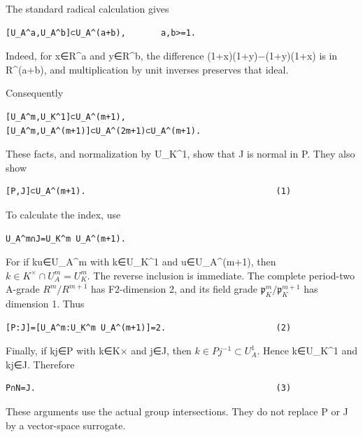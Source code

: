 The standard radical calculation gives

\begin{Verbatim}[fontsize=\small,breaklines=true,breakanywhere=true]
[U_A^a,U_A^b]⊂U_A^(a+b),       a,b>=1.
\end{Verbatim}

Indeed, for x∈R\^{}a and y∈R\^{}b, the difference (1+x)(1+y)−(1+y)(1+x)
is in R\^{}(a+b), and multiplication by unit inverses preserves that
ideal.

Consequently

\begin{Verbatim}[fontsize=\small,breaklines=true,breakanywhere=true]
[U_A^m,U_K^1]⊂U_A^(m+1),
[U_A^m,U_A^(m+1)]⊂U_A^(2m+1)⊂U_A^(m+1).
\end{Verbatim}

These facts, and normalization by U\_K\^{}1, show that J is normal in P.
They also show

\begin{Verbatim}[fontsize=\small,breaklines=true,breakanywhere=true]
[P,J]⊂U_A^(m+1).                                      (1)
\end{Verbatim}

To calculate the index, use

\begin{Verbatim}[fontsize=\small,breaklines=true,breakanywhere=true]
U_A^m∩J=U_K^m U_A^(m+1).
\end{Verbatim}

For if ku∈U\_A\^{}m with k∈U\_K\^{}1 and u∈U\_A\^{}(m+1), then
\(k\in K^\times\cap U_A^m=U_K^m\). The reverse inclusion is immediate.
The complete period-two A-grade \(R^m/R^{m+1}\) has
F2-dimension 2, and its field grade \(\mathfrak p_K^m/\mathfrak p_K^{m+1}\) has
dimension 1. Thus

\begin{Verbatim}[fontsize=\small,breaklines=true,breakanywhere=true]
[P:J]=[U_A^m:U_K^m U_A^(m+1)]=2.                      (2)
\end{Verbatim}

Finally, if kj∈P with k∈K× and j∈J, then \(k\in Pj^{-1}\subset U_A^1\).
Hence k∈U\_K\^{}1 and kj∈J. Therefore

\begin{Verbatim}[fontsize=\small,breaklines=true,breakanywhere=true]
P∩N=J.                                                (3)
\end{Verbatim}

These arguments use the actual group intersections. They do not replace
P or J by a vector-space surrogate.

